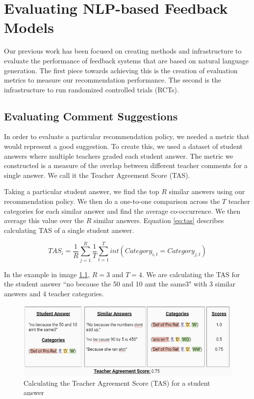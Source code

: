 \documentclass[12pt]{report}
\begin{document}
\chapter{Evaluating NLP-based Feedback Models}

Our previous work has been focused on creating methods and infrastructure to evaluate the performance of feedback systems that are based on natural language generation. The first piece towards achieving this is the creation of evaluation metrics to measure our recommendation performance. The second is the infrastructure to run randomized controlled trials (RCTs). 

\section{Evaluating Comment Suggestions}

In order to evaluate a particular recommendation policy, we needed a metric that would represent a good suggestion. To create this, we used a dataset of student answers where multiple teachers graded each student answer. The metric we constructed is a measure of the overlap between different teacher comments for a single answer. We call it the Teacher Agreement Score (TAS). 

Taking a particular student answer, we find the top $R$ similar answers using our recommendation policy. We then do a one-to-one comparison across the $T$ teacher categories for each similar answer and find the average co-occurrence. We then average this value over the $R$ similar answers. Equation \ref{eq:tas} describes calculating TAS of a single student answer.

\begin{equation} 
    TAS_{i}=\frac{1}{R}\sum_{j=1}^{R}\frac{1}{T}\sum_{t=1}^{T}int(Category_{i,t}=Category_{j,t}) 
    \label{eq:tas}
\end{equation}

In the example in image \ref{img:tas_example}, $R = 3$ and $T = 4$. We are calculating the TAS for the student answer ``no because the 50 and 10 amt the same3" with 3 similar answers and 4 teacher categories.

\begin{figure}[ht] 
    \centering
    \includegraphics[width=\textwidth]{images/tas_example.png}
    \caption{Calculating the Teacher Agreement Score (TAS) for a student answer}
    \label{img:tas_example}
\end{figure}
\end{document}
